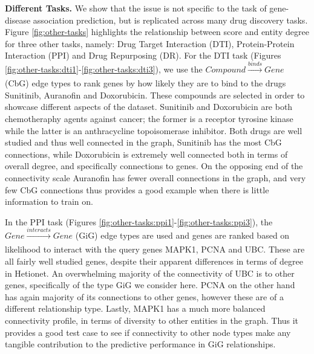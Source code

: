 \textbf{Different Tasks.} We show that the issue is not specific to the task of gene-disease association prediction, but is replicated across many drug discovery tasks. Figure \ref{fig:other-tasks} highlights the relationship between score and entity degree for three other tasks, namely: Drug Target Interaction (DTI), Protein-Protein Interaction (PPI) and Drug Repurposing (DR). For the DTI task (Figures \ref{fig:other-tasks:dti1}-\ref{fig:other-tasks:dti3}), we use the \(\mathit{Compound} \xrightarrow[]{\mathit{binds}} \mathit{Gene}\) (CbG) edge types to rank genes by how likely they are to bind to the drugs Sunitinib, Auranofin and Doxorubicin. These compounds are selected in order to showcase different aspects of the dataset. Sunitinib and Doxorubicin are both chemotheraphy agents against cancer; the former is a receptor tyrosine kinase while the latter is an anthracycline topoisomerase inhibitor. Both drugs are well studied and thus well connected in the graph, Sunitinib has the most CbG connections, while Doxorubicin is extremely well connected both in terms of overall degree, and specifically connections to genes. On the opposing end of the connectivity scale Auranofin has fewer overall connections in the graph, and very few CbG connections thus provides a good example when there is little information to train on.

In the PPI task (Figures \ref{fig:other-tasks:ppi1}-\ref{fig:other-tasks:ppi3}), the \(\mathit{Gene} \xrightarrow[]{\mathit{interacts}} \mathit{Gene}\) (GiG) edge types are used and genes are ranked based on likelihood to interact with the query genes MAPK1, PCNA and UBC. These are all fairly well studied genes, despite their apparent differences in terms of degree in Hetionet. An overwhelming majority of the connectivity of UBC is to other genes, specifically of the type GiG we consider here. PCNA on the other hand has again majority of its connections to other genes, however these are of a different relationship type. Lastly, MAPK1 has a much more balanced connectivity profile, in terms of diversity to other entities in the graph. Thus it provides a good test case to see if connectivity to other node types make any tangible contribution to the predictive performance in GiG relationships.

